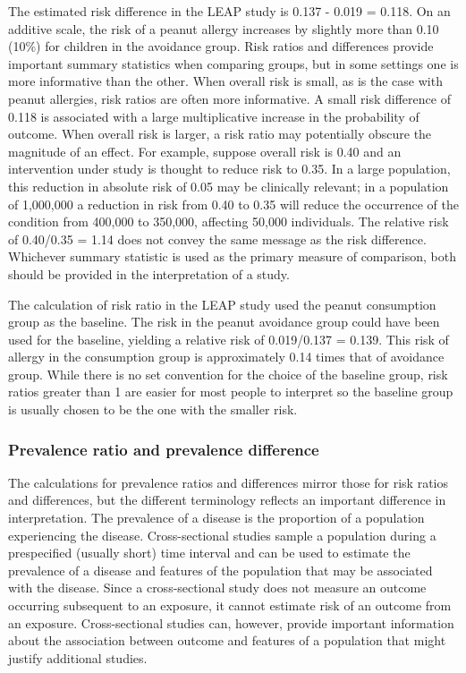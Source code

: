 The estimated risk difference in the LEAP study is 0.137 - 0.019 = 0.118.  On an additive scale, the risk of a peanut allergy increases by slightly more than 0.10 (10\%) for children in the avoidance group.  Risk ratios and differences provide important summary statistics when comparing groups, but in some settings one is more informative than the other.  When overall risk is small, as is the case with peanut allergies, risk ratios are often more informative.  A small risk difference of 0.118 is associated with a large multiplicative increase in the probability of outcome. When overall risk is larger, a risk ratio may potentially obscure the magnitude of an effect. For example, suppose overall risk is 0.40 and an intervention under study is thought to reduce risk to 0.35. In a large population, this reduction in absolute risk of 0.05 may be clinically relevant; in a population of 1,000,000 a reduction in risk from 0.40 to 0.35 will reduce the occurrence of the condition from 400,000 to 350,000, affecting 50,000 individuals. The relative risk of 0.40/0.35 = 1.14 does not convey the same message as the risk difference. Whichever summary statistic is used as the primary measure of comparison, both should be provided in the interpretation of a study.

The calculation of risk ratio in the LEAP study used the peanut consumption group as the baseline.  The risk in the peanut avoidance group could have been used for the baseline, yielding a relative risk of 0.019/0.137 = 0.139.  This risk of allergy in the consumption group is approximately 0.14 times that of avoidance group.  While there is no set convention for the choice of the baseline group, risk ratios greater than 1 are easier for most people to interpret so the baseline group is usually chosen to be the one with the smaller risk.

\subsubsection{Prevalence ratio and prevalence difference}

The calculations for prevalence ratios and differences mirror those for risk ratios and differences, but the different terminology reflects an important difference in interpretation.  The prevalence of a disease is the proportion of a population experiencing the disease.  Cross-sectional studies sample a population during a prespecified (usually short) time interval and can be used to estimate the prevalence of a disease and features of the population that may be associated with the disease. Since a cross-sectional study does not measure an outcome occurring subsequent to an exposure, it cannot estimate risk of an outcome from an exposure.  Cross-sectional studies can, however, provide important information about the association between outcome and features of a population that might justify additional studies.

